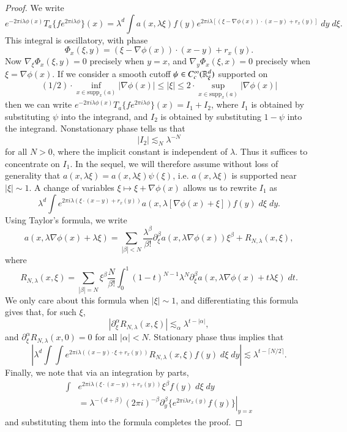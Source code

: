 \begin{proof}
    We write
    \[ e^{-2 \pi i \lambda \phi(x)} T_a \{ f e^{2 \pi i \lambda \phi} \}(x) = \lambda^d \int a(x, \lambda \xi) f(y) e^{2 \pi i \lambda [ (\xi - \nabla \phi(x)) \cdot (x - y) + r_x(y) ]}\; dy\; d\xi. \]
    This integral is oscillatory, with phase
    \[ \Phi_x(\xi,y) = (\xi - \nabla \phi(x)) \cdot (x - y) + r_x(y). \]
    Now $\nabla_\xi \Phi_x(\xi,y) = 0$ precisely when $y = x$, and $\nabla_y \Phi_x(\xi,x) = 0$ precisely when $\xi = \nabla \phi(x)$. If we consider a smooth cutoff $\psi \in C_c^\infty(\operatorname{\mathbb{R}}^d_\xi)$ supported on
    \[ (1/2) \cdot \inf_{x \in \text{supp}_x(a)} |\nabla \phi(x)| \leq |\xi| \leq 2 \cdot \sup_{x \in \text{supp}_x(a)} |\nabla \phi(x)| \]
    then we can write $e^{-2 \pi i \lambda \phi(x)} T_a \{ f e^{2 \pi i \lambda \phi} \}(x) = I_1 + I_2$, where $I_1$ is obtained by substituting $\psi$ into the integrand, and $I_2$ is obtained by substituting $1 - \psi$ into the integrand. Nonstationary phase tells us that
    \[ |I_2| \lesssim_N \lambda^{-N} \]
    for all $N > 0$, where the implicit constant is independent of $\lambda$. Thus it suffices to concentrate on $I_1$. In the sequel, we will therefore assume without loss of generality that $a(x, \lambda \xi) = a(x, \lambda \xi) \psi(\xi)$, i.e. $a(x, \lambda \xi)$ is supported near $|\xi| \sim 1$. A change of variables $\xi \mapsto \xi + \nabla \phi(x)$ allows us to rewrite $I_1$ as
    \[ \lambda^d \int e^{2 \pi i \lambda ( \xi \cdot (x - y) + r_x(y) )} a(x, \lambda [\nabla \phi(x) + \xi]) f(y)\; d\xi\; dy. \]
    Using Taylor's formula, we write
    \[ a(x, \lambda \nabla \phi(x) + \lambda \xi) = \sum_{|\beta| < N} \frac{\lambda^\beta}{\beta !} \partial_\xi^\beta a(x, \lambda \nabla \phi(x)) \xi^\beta + R_{N,\lambda}(x,\xi), \]
    where
    \[ R_{N,\lambda}(x,\xi) = \sum_{|\beta| = N} \xi^\beta \frac{N}{\beta!} \int_0^1 (1 - t)^{N-1} \lambda^N \partial^\beta_\xi a(x, \lambda \nabla \phi(x) + t \lambda \xi)\; dt. \]
    We only care about this formula when $|\xi| \sim 1$, and differentiating this formula gives that, for such $\xi$,
    \[ |\partial_\xi^\alpha R_{N,\lambda}(x,\xi)| \lesssim_\alpha \lambda^{t - |\alpha|}, \]
    and $\partial_\xi^\alpha R_{N,\lambda}(x,0) = 0$ for all $|\alpha| < N$. Stationary phase thus implies that
    \[ \left| \lambda^d \int \int e^{2 \pi i \lambda ((x - y) \cdot \xi + r_x(y))} R_{N,\lambda}(x,\xi) f(y)\; d\xi\; dy \right| \lesssim \lambda^{t - \lceil N/2 \rceil}. \]
    Finally, we note that via an integration by parts,
    \begin{align*}
        \int & e^{2 \pi i \lambda (\xi \cdot (x - y) + r_x(y))} \xi^\beta f(y)\; d\xi\; dy\\
        &= \lambda^{-(d + \beta)} (2 \pi i)^{-\beta} \left. \partial_y^\beta \{ e^{2 \pi i \lambda r_x(y)} f(y) \} \right|_{y = x}
    \end{align*}
    and substituting them into the formula completes the proof.
\end{proof}

